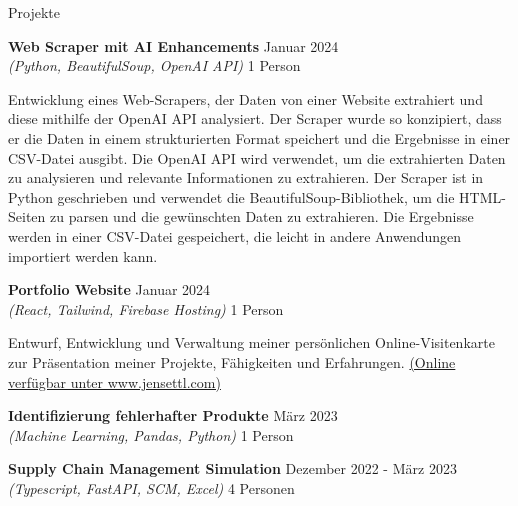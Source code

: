 \documentclass{resume} %
\begin{document}
\begin{rSection}{Projekte}
\begin{adjustwidth}{0.5cm}{}
        \item \textbf{Web Scraper mit AI Enhancements} \hfill {Januar 2024} \\
        \textit{(Python, BeautifulSoup, OpenAI API)} \hfill {1 Person}\\
        \raggedright{Entwicklung eines Web-Scrapers, der Daten von einer Website extrahiert und diese mithilfe der OpenAI API analysiert.
        Der Scraper wurde so konzipiert, dass er die Daten in einem strukturierten Format speichert und die Ergebnisse in einer CSV-Datei ausgibt.
        Die OpenAI API wird verwendet, um die extrahierten Daten zu analysieren und relevante Informationen zu extrahieren.
        Der Scraper ist in Python geschrieben und verwendet die BeautifulSoup-Bibliothek, um die HTML-Seiten zu parsen und die gewünschten Daten zu extrahieren.
        Die Ergebnisse werden in einer CSV-Datei gespeichert, die leicht in andere Anwendungen importiert werden kann.}

        \item \textbf{Portfolio Website} \hfill {Januar 2024} \\
        \textit{(React, Tailwind, Firebase Hosting)} \hfill {1 Person}\\ 
        \raggedright{Entwurf, Entwicklung und Verwaltung meiner persönlichen Online-Visitenkarte zur Präsentation meiner Projekte, Fähigkeiten und
        Erfahrungen. \href{https://www.jensettl.com//}{(Online verfügbar unter www.jensettl.com)}}

        \item \textbf{Identifizierung fehlerhafter Produkte} \hfill {März 2023} \\
        \textit{(Machine Learning, Pandas, Python)} \hfill {1 Person}\\
    
        \item \textbf{Supply Chain Management Simulation} \hfill {Dezember 2022 - März 2023} \\
        \textit{(Typescript, FastAPI, SCM, Excel)} \hfill {4 Personen}\\ 
    

\end{adjustwidth}
\end{rSection}
\end{document}
